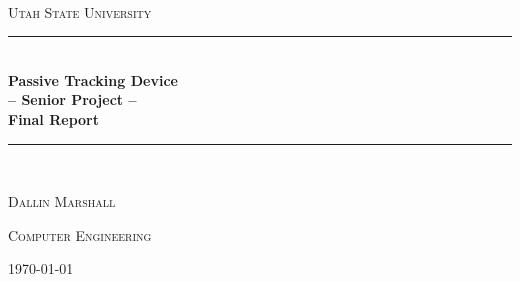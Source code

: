 \documentclass[11pt]{article}
\begin{document}
\newcommand{\HRule}{\rule{\linewidth}{0.5mm}}

\begin{titlepage}
\begin{center}

~\\[4cm]

\textsc{\Large \textsc{Utah State University} }\\[0.5cm]

\HRule \\[0.4cm]
{ \huge \bfseries Passive Tracking Device \\ -- Senior Project -- \\ Final Report \\[0.4cm] }

\HRule \\[1.5cm]

\noindent
\begin{minipage}{0.4\textwidth}
\begin{flushleft} \large
\textsc{ Dallin Marshall }
\end{flushleft}
\end{minipage}%
\begin{minipage}{0.4\textwidth}
\begin{flushright} \large
\textsc{ Computer Engineering }
\end{flushright}
\end{minipage}

\vfill

{\large \today}

\end{center}
\end{titlepage}
\end{document}
